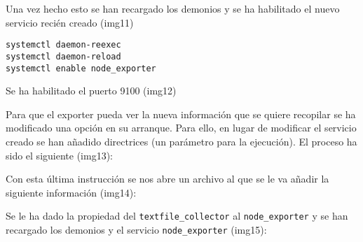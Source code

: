 Una vez hecho esto se han recargado los demonios y se ha habilitado el
nuevo servicio recién creado (img11)

\begin{verbatim}
systemctl daemon-reexec
systemctl daemon-reload
systemctl enable node_exporter
\end{verbatim}

Se ha habilitado el puerto 9100 (img12)

\begin{Shaded}
\begin{Highlighting}[]
  \OperatorTok{=}
 
\end{Highlighting}
\end{Shaded}

Para que el exporter pueda ver la nueva información que se quiere
recopilar se ha modificado una opción en su arranque. Para ello, en
lugar de modificar el servicio creado se han añadido directrices (un
parámetro para la ejecución). El proceso ha sido el siguiente (img13):

\begin{Shaded}
\begin{Highlighting}[]
\end{Highlighting}
\end{Shaded}

Con esta última instrucción se nos abre un archivo al que se le va
añadir la siguiente información (img14):

\begin{Shaded}
\begin{Highlighting}[]
\ExtensionTok{[Service]}
\OperatorTok{=}
\OperatorTok{=}
\end{Highlighting}
\end{Shaded}

Se le ha dado la propiedad del \texttt{textfile\_collector} al
\texttt{node\_exporter} y se han recargado los demonios y el servicio
\texttt{node\_exporter} (img15):

\begin{Shaded}
\begin{Highlighting}[]
\end{Highlighting}
\end{Shaded}

